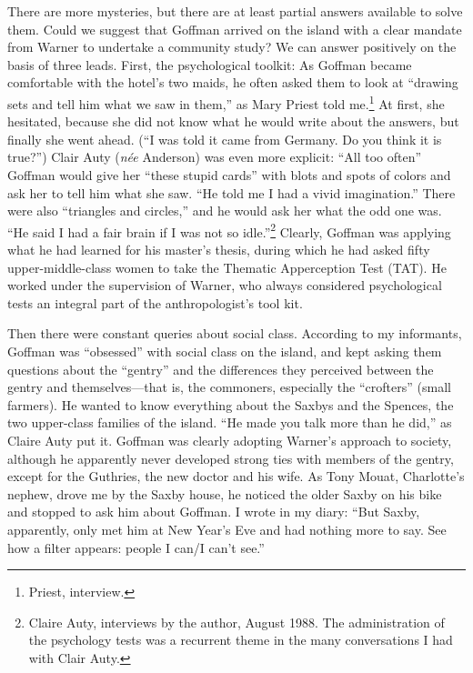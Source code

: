 \documentclass[openany,nobib]{tufte-book}
\begin{document}
There are more mysteries, but there are at least partial answers
available to solve them. Could we suggest that Goffman arrived on the
island with a clear mandate from Warner to undertake a community study?
We can answer positively on the basis of three leads. First, the
psychological toolkit: As Goffman became comfortable with the hotel's
two maids, he often asked them to look at ``drawing sets and tell him
what we saw in them,'' as Mary Priest told me.\footnote{Priest,
  interview.} At first, she hesitated, because she did not know what he
would write about the answers, but finally she went ahead. (``I was told
it came from Germany. Do you think it is true?'') Clair Auty (\emph{n\'ee} Anderson) was even
more explicit: ``All too often'' Goffman would give her ``these stupid
cards'' with blots and spots of colors and ask her to tell him what she
saw. ``He told me I had a vivid imagination.'' There were also
``triangles and circles,'' and he would ask her what the odd one was.
``He said I had a fair brain if I was not so idle.''\footnote{Claire
  Auty, interviews by the author, August 1988. The administration of
  the psychology tests was a recurrent theme in the many conversations I
  had with Clair Auty.} Clearly, Goffman was applying what he had
learned for his master's thesis, during which he had asked fifty
upper-middle-class women to take the Thematic Apperception Test (TAT).
He worked under the supervision of Warner, who always considered
psychological tests an integral part of the anthropologist's tool kit.

Then there were constant queries about social class. According to my
informants, Goffman was ``obsessed'' with social class on the island,
and kept asking them questions about the ``gentry'' and the differences
they perceived between the gentry and themselves---that is, the
commoners, especially the ``crofters'' (small farmers). He wanted to
know everything about the Saxbys and the Spences, the two upper-class
families of the island. ``He made you talk more than he did,'' as Claire
Auty put it. Goffman was clearly adopting Warner's approach to society,
although he apparently never developed strong ties with members of the
gentry, except for the Guthries, the new doctor and his wife. As Tony
Mouat, Charlotte's nephew, drove me by the Saxby house, he noticed the
older Saxby on his bike and stopped to ask him about Goffman. I wrote in
my diary: ``But Saxby, apparently, only met him at New Year's Eve and
had nothing more to say. See how a filter appears: people I can/I can't
see.''
\end{document}

